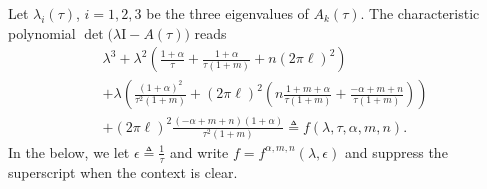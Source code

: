 \documentclass[a4paper,11pt]{article}
\def\l{(2\pi \ell)}
\theoremstyle{remark}
\begin{document}
Let $\lambda_i(\tau)$, $i=1,2,3$ be the three eigenvalues of $A_k(\tau)$. %
The characteristic polynomial $\det\big(\lambda \textrm{I} - A(\tau)\big)$ reads
\begin{equation}
\begin{aligned}
 &\lambda^3 + \lambda^2\left( \frac{1+\alpha}{\tau} + \frac{1+\alpha}{\tau(1+m)} + n\l^2\right) \\
 &+ \lambda\left( \frac{(1+\alpha)^2}{\tau^2(1+m)}
 + \l^2\left( n\frac{1+m+\alpha}{\tau(1+m)} + \frac{-\alpha+m+n}{\tau(1+m)}\right)\right) \\
 &+ \l^2\frac{(-\alpha+m+n)(1+\alpha)}{\tau^2(1+m)}\triangleq f(\lambda,\tau,\alpha,m,n). \label{eq:poly}
\end{aligned}
\end{equation}
In the below, we let $\epsilon\triangleq \frac{1}{\tau}$ and write $f = f^{\alpha,m,n}(\lambda,\epsilon)$ and suppress the superscript when the context  is clear.
\end{document}

